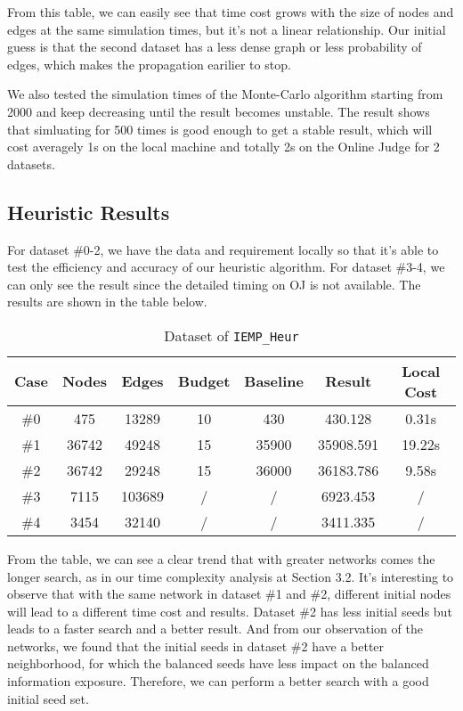 \documentclass{article}
\begin{document}
From this table, we can easily see that time cost grows with the size of nodes and edges at the same simulation times, but it's not a linear relationship. Our initial guess is that the second dataset has a less dense graph or less probability of edges, which makes the propagation earilier to stop.

We also tested the simulation times of the Monte-Carlo algorithm starting from 2000 and keep decreasing until the result becomes unstable. The result shows that simluating for 500 times is good enough to get a stable result, which will cost averagely 1s on the local machine and totally 2s on the Online Judge for 2 datasets.

\subsection{Heuristic Results}

For dataset \#0-2, we have the data and requirement locally so that it's able to test the efficiency and accuracy of our heuristic algorithm. For dataset \#3-4, we can only see the result since the detailed timing on OJ is not available. The results are shown in the table below.

\begin{table}[!htbp]
\setlength{\abovecaptionskip}{+0.2cm}
\setlength{\belowcaptionskip}{+0.2cm}
\centering
\caption{Dataset of \texttt{IEMP\_Heur}}
\begin{tabular}{ccccccc}
\toprule
\textbf{Case} & \textbf{Nodes} & \textbf{Edges} & \textbf{Budget} & \textbf{Baseline} & \textbf{Result} & \textbf{Local Cost} \\ 
\midrule
\#0 & 475 & 13289 & 10 & 430 & 430.128 & 0.31s \\
\#1 & 36742 & 49248 & 15 & 35900 & 35908.591 & 19.22s \\
\#2 & 36742 & 29248 & 15 & 36000 & 36183.786 & 9.58s \\
\#3 & 7115 & 103689 & / & / & 6923.453 & / \\
\#4 & 3454 & 32140 & / & / & 3411.335 & / \\
\bottomrule
\end{tabular}
\end{table}

From the table, we can see a clear trend that with greater networks comes the longer search, as in our time complexity analysis at Section 3.2. It's interesting to observe that with the same network in dataset \#1 and \#2, different initial nodes will lead to a different time cost and results. Dataset \#2 has less initial seeds but leads to a faster search and a better result. And from our observation of the networks, we found that the initial seeds in dataset \#2 have a better neighborhood, for which the balanced seeds have less impact on the balanced information exposure. Therefore, we can perform a better search with a good initial seed set.
\end{document}
